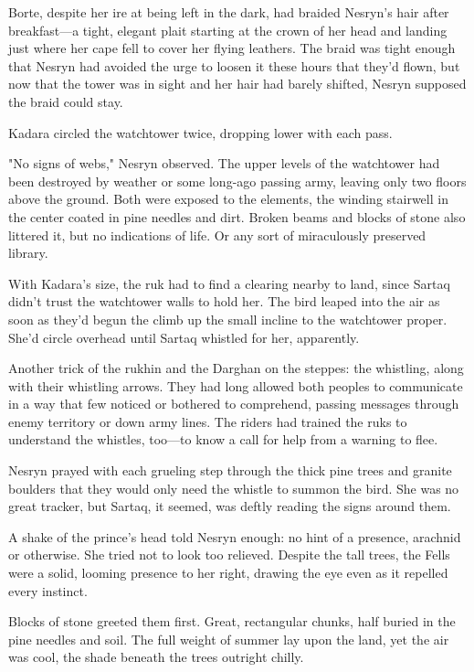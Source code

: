 Borte, despite her ire at being left in the dark, had braided Nesryn's hair after breakfast---a tight, elegant plait starting at the crown of her head and landing just where her cape fell to cover her flying leathers. The braid was tight enough that Nesryn had avoided the urge to loosen it these hours that they'd flown, but now that the tower was in sight and her hair had barely shifted, Nesryn supposed the braid could stay.

Kadara circled the watchtower twice, dropping lower with each pass.

"No signs of webs," Nesryn observed. The upper levels of the watchtower had been destroyed by weather or some long-ago passing army, leaving only two floors above the ground. Both were exposed to the elements, the winding stairwell in the center coated in pine needles and dirt. Broken beams and blocks of stone also littered it, but no indications of life. Or any sort of miraculously preserved library.

With Kadara's size, the ruk had to find a clearing nearby to land, since Sartaq didn't trust the watchtower walls to hold her. The bird leaped into the air as soon as they'd begun the climb up the small incline to the watchtower proper. She'd circle overhead until Sartaq whistled for her, apparently.

Another trick of the rukhin and the Darghan on the steppes: the whistling, along with their whistling arrows. They had long allowed both peoples to communicate in a way that few noticed or bothered to comprehend, passing messages through enemy territory or down army lines. The riders had trained the ruks to understand the whistles, too---to know a call for help from a warning to flee.

Nesryn prayed with each grueling step through the thick pine trees and granite boulders that they would only need the whistle to summon the bird. She was no great tracker, but Sartaq, it seemed, was deftly reading the signs around them.

A shake of the prince's head told Nesryn enough: no hint of a presence, arachnid or otherwise. She tried not to look too relieved. Despite the tall trees, the Fells were a solid, looming presence to her right, drawing the eye even as it repelled every instinct.

Blocks of stone greeted them first. Great, rectangular chunks, half buried in the pine needles and soil. The full weight of summer lay upon the land, yet the air was cool, the shade beneath the trees outright chilly.


